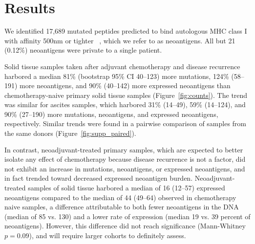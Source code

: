 \section*{Results}


We identified 17,689 mutated peptides predicted to bind autologous MHC class I with affinity 500nm or tighter ~\cite{Sette1994}, which we refer to as neoantigens. All but 21 (0.12\%) neoantigens were private to a single patient.

Solid tissue samples taken after adjuvant chemotherapy and disease recurrence harbored a median 81\% (bootstrap 95\% CI 40--123) more mutations, 124\% (58--191) more neoantigens, and 90\% (40--142) more expressed neoantigens than chemotherapy-naive primary solid tissue samples (Figure~\ref{fig:counts}). The trend was similar for ascites samples, which harbored 31\% (14--49), 59\% (14--124), and 90\% (27--190) more mutations, neoantigens, and expressed neoantigens, respectively. Similar trends were found in a pairwise comparison of samples from the same donors (Figure~\ref{fig:supp_paired}). 


In contrast, neoadjuvant-treated primary samples, which are expected to better isolate any effect of chemotherapy because disease recurrence is not a factor, did not exhibit an increase in mutations, neoantigens, or expressed neoantigens, and in fact trended toward decreased expressed neoantigen burden. Neoadjuvant-treated samples of solid tissue harbored a median of 16 (12--57) expressed neoantigens compared to the median of 44 (49--64) observed in chemotherapy naive samples, a difference attributable to both fewer neoantigens in the DNA (median of 85 vs. 130) and a lower rate of expression (median 19 vs. 39 percent of neoantigens). However, this difference did not reach significance (Mann-Whitney $p=0.09$), and will require larger cohorts to definitely assess.

